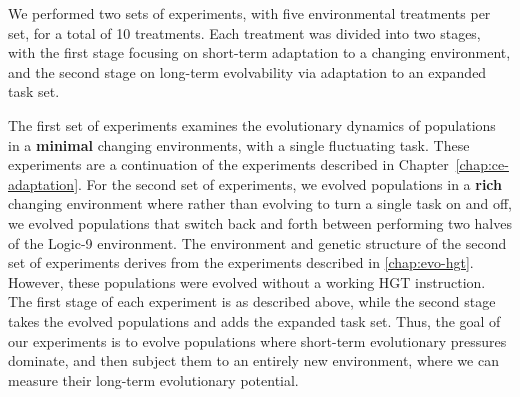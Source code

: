 \documentclass[PhD]{msu-thesis}
\begin{document}
We performed two sets of experiments, with five environmental treatments per set, for a total of 10 treatments. Each treatment was divided into two stages, with the first stage focusing on short-term adaptation to a changing environment, and the second stage on long-term evolvability via adaptation to an expanded task set.

The first set of experiments examines the evolutionary dynamics of populations in a \textbf{minimal} changing environments, with a single fluctuating task. These experiments are a continuation of the experiments described in Chapter~\ref{chap:ce-adaptation}. For the second set of experiments, we evolved populations in a \textbf{rich} changing environment where rather than evolving to turn a single task on and off, we evolved populations that switch back and forth between performing two halves of the Logic-9 environment. The environment and genetic structure of the second set of experiments derives from the experiments described in \ref{chap:evo-hgt}. However, these populations were evolved without a working HGT instruction.
The first stage of each experiment is as described above, while the second stage takes the evolved populations and adds the expanded task set. Thus, the goal of our experiments is to evolve populations where short-term evolutionary pressures dominate, and then subject them to an entirely new environment, where we can measure their long-term evolutionary potential.

\end{document}
